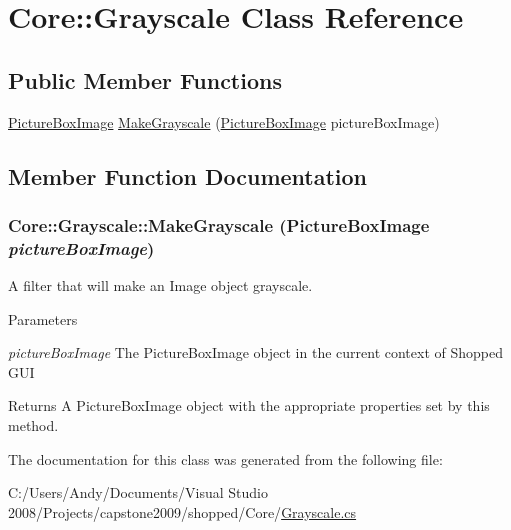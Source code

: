 \hypertarget{class_core_1_1_grayscale}{
\section{Core::Grayscale Class Reference}
\label{class_core_1_1_grayscale}
}
\subsection*{Public Member Functions}
\begin{DoxyCompactItemize}
\item 
\hyperlink{class_core_1_1_images_1_1_picture_box_image}{PictureBoxImage} \hyperlink{class_core_1_1_grayscale_aec6bcfc2f573c3a24e896a08e06468a3}{MakeGrayscale} (\hyperlink{class_core_1_1_images_1_1_picture_box_image}{PictureBoxImage} pictureBoxImage)
\end{DoxyCompactItemize}


\subsection{Member Function Documentation}
\hypertarget{class_core_1_1_grayscale_aec6bcfc2f573c3a24e896a08e06468a3}{
\subsubsection[{MakeGrayscale}]{ Core::Grayscale::MakeGrayscale ({\bf PictureBoxImage} {\em pictureBoxImage})}}
\label{class_core_1_1_grayscale_aec6bcfc2f573c3a24e896a08e06468a3}
A filter that will make an Image object grayscale.


\begin{DoxyParams}{Parameters}
\item[{\em pictureBoxImage}]The PictureBoxImage object in the current context of Shopped GUI \end{DoxyParams}
\begin{DoxyReturn}{Returns}
A PictureBoxImage object with the appropriate properties set by this method. 
\end{DoxyReturn}


The documentation for this class was generated from the following file:\begin{DoxyCompactItemize}
\item 
C:/Users/Andy/Documents/Visual Studio 2008/Projects/capstone2009/shopped/Core/\hyperlink{_grayscale_8cs}{Grayscale.cs}\end{DoxyCompactItemize}

